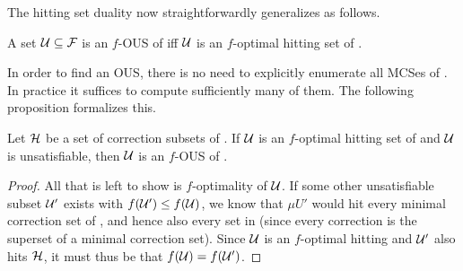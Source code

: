 The hitting set duality now straightforwardly generalizes as follows. 

\begin{proposition}\label{prop:optimal-hitting-set}
  A set $\mathcal{U} \subseteq \mathcal{F} $ is an $f$-OUS of \formula iff $\mathcal{U}$ is an $f$-optimal hitting set of \mcses{\formula}.
\end{proposition}
 

In order to find an OUS, there is no need to explicitly enumerate all MCSes of \formula. In practice it suffices to compute sufficiently many of them. 
The following proposition formalizes this. 
% 

\begin{proposition}\label{prop:K}
  Let $\mathcal{H}$ be a set of correction subsets of \formula {} . 
  If $\mathcal{U}$ is an $f$-optimal hitting set of  and $\mathcal{U}$ is unsatisfiable, then $\mathcal{U}$ is an $f$-OUS of \formula. 
\end{proposition}
\begin{proof}
  All that is left to show is $f$-optimality of $\mathcal{U}$.
  If some other unsatisfiable subset $\mathcal{U}'$ exists with $f(\mathcal{U}')\leq f(\mathcal{U})$, we know that $\mu{U}'$ would hit every minimal correction set of , and hence also every set in  (since every correction is the superset of a minimal correction set).
  Since $\mathcal{U}$ is an $f$-optimal hitting and $\mathcal{U}'$ also hits $\mathcal{H}$, it must thus be that $f(\mathcal{U})=f(\mathcal{U'})$. 
%   
\end{proof}




